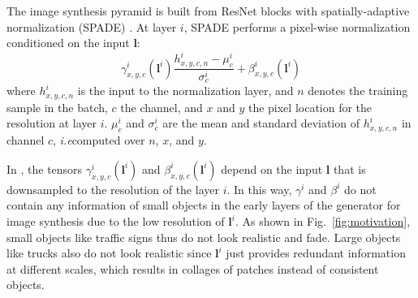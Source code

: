 \documentclass{bmvc2k}
\newcommand{\figref}[1]{Fig.~\ref{#1}}
\def\ie{\emph{i.e}\bmvaOneDot}
\begin{document}
The image synthesis pyramid is built from ResNet blocks \cite{he2016deep} with spatially-adaptive normalization (SPADE) \cite{park2019semantic}. At layer $i$, SPADE performs a pixel-wise normalization conditioned on the input $\mathbf{l}$:
\begin{equation}
    \gamma^i_{x,y,c}(\mathbf{l}^i)\frac{h^i_{x,y,c,n}-\mu^i_c}{\sigma^i_c} + \beta^i_{x,y,c}(\mathbf{l}^i)
\end{equation}
where $h^i_{x,y,c,n}$ is the input to the normalization layer, and $n$ denotes the training sample in the batch, $c$ the channel, and $x$ and $y$ the pixel location for the resolution at layer $i$. $\mu^i_c$ and $\sigma^i_c$ are the mean and standard deviation of $h^i_{x,y,c,n}$ in channel $c$, \ie computed over $n$, $x$, and $y$. 

In \cite{park2019semantic,schonfeld_sushko_iclr2021}, the tensors $\gamma^i_{x,y,c}(\mathbf{l}^i)$ and $\beta^i_{x,y,c}(\mathbf{l}^i)$ depend on the input $\mathbf{l}$ that is downsampled to the resolution of the layer $i$. In this way, $\gamma^i$ and $\beta^i$ do not contain any information of small objects in the early layers of the generator for image synthesis due to the low resolution of $\mathbf{l}^i$. As shown in \figref{fig:motivation}, small objects like traffic signs thus do not look realistic and fade. Large objects like trucks also do not look realistic since $\mathbf{l}^i$ just provides redundant information at different scales, which results in collages of patches instead of consistent objects.     
\end{document}
